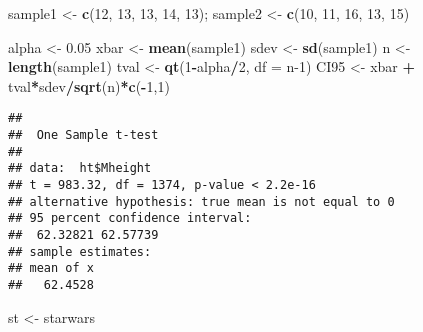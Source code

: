 \documentclass[]{article}
\newenvironment{Shaded}{\begin{snugshade}}{\end{snugshade}}
\newcommand{\DataTypeTok}[1]{\textcolor[rgb]{0.13,0.29,0.53}{#1}}
\newcommand{\DecValTok}[1]{\textcolor[rgb]{0.00,0.00,0.81}{#1}}
\newcommand{\FloatTok}[1]{\textcolor[rgb]{0.00,0.00,0.81}{#1}}
\newcommand{\KeywordTok}[1]{\textcolor[rgb]{0.13,0.29,0.53}{\textbf{#1}}}
\newcommand{\NormalTok}[1]{#1}
\newcommand{\OperatorTok}[1]{\textcolor[rgb]{0.81,0.36,0.00}{\textbf{#1}}}
\newcommand{\StringTok}[1]{\textcolor[rgb]{0.31,0.60,0.02}{#1}}
\begin{document}
\begin{Shaded}
\begin{Highlighting}[]
\NormalTok{sample1 <-}\StringTok{ }\KeywordTok{c}\NormalTok{(}\DecValTok{12}\NormalTok{, }\DecValTok{13}\NormalTok{, }\DecValTok{13}\NormalTok{, }\DecValTok{14}\NormalTok{, }\DecValTok{13}\NormalTok{); sample2 <-}\StringTok{ }\KeywordTok{c}\NormalTok{(}\DecValTok{10}\NormalTok{, }\DecValTok{11}\NormalTok{, }\DecValTok{16}\NormalTok{, }\DecValTok{13}\NormalTok{, }\DecValTok{15}\NormalTok{)}

\NormalTok{alpha <-}\StringTok{ }\FloatTok{0.05}
\NormalTok{xbar <-}\StringTok{ }\KeywordTok{mean}\NormalTok{(sample1)}
\NormalTok{sdev <-}\StringTok{ }\KeywordTok{sd}\NormalTok{(sample1)}
\NormalTok{n <-}\StringTok{ }\KeywordTok{length}\NormalTok{(sample1)}
\NormalTok{tval <-}\StringTok{ }\KeywordTok{qt}\NormalTok{(}\DecValTok{1}\OperatorTok{-}\NormalTok{alpha}\OperatorTok{/}\DecValTok{2}\NormalTok{, }\DataTypeTok{df =}\NormalTok{ n}\DecValTok{-1}\NormalTok{)}
\NormalTok{CI95 <-}\StringTok{ }\NormalTok{xbar }\OperatorTok{+}\StringTok{ }\NormalTok{tval}\OperatorTok{*}\NormalTok{sdev}\OperatorTok{/}\KeywordTok{sqrt}\NormalTok{(n)}\OperatorTok{*}\KeywordTok{c}\NormalTok{(}\OperatorTok{-}\DecValTok{1}\NormalTok{,}\DecValTok{1}\NormalTok{)}
\end{Highlighting}
\end{Shaded}

\begin{Shaded}
\end{Shaded}

\begin{verbatim}
## 
##  One Sample t-test
## 
## data:  ht$Mheight
## t = 983.32, df = 1374, p-value < 2.2e-16
## alternative hypothesis: true mean is not equal to 0
## 95 percent confidence interval:
##  62.32821 62.57739
## sample estimates:
## mean of x 
##   62.4528
\end{verbatim}

\begin{Shaded}
\begin{Highlighting}[]
\NormalTok{st <-}\StringTok{ }\NormalTok{starwars}
\end{Highlighting}
\end{Shaded}

\begin{Shaded}
\end{Shaded}
\end{document}
